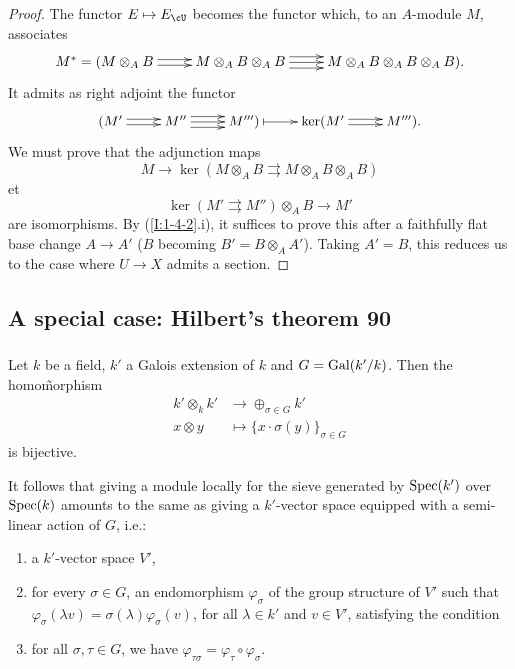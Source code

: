 \begin{proof}
The functor $E\mapsto E_\cU$ becomes the functor which, to an $A$-module $M$,
associates 
\[\xymatrix{
  M^* = (M\otimes_A B \ar@<2pt>[r] \ar@<-2pt>[r] 
    & M\otimes_A B\otimes_A B \ar@<-4pt>[r] \ar[r] \ar@<4pt>[r] 
    & M\otimes_A B\otimes_A B\otimes_A B)\text{.}
}\]
It admits as right adjoint the functor
\[\xymatrix{
  (M' \ar@<2pt>[r] \ar@<-2pt>[r] 
    & M'' \ar@<-4pt>[r] \ar[r] \ar@<4pt>[r]
    & M''') \ar@{|->}[r] 
    & \ker(M' \ar@<2pt>[r] \ar@<-2pt>[r] 
    & M''')\text{.}
}\]
We must prove that the adjunction maps 
\[
  M \to\ker(M\otimes_A B\rightrightarrows M\otimes_A B\otimes_A B)
\]
et
\[
  \ker(M'\rightrightarrows M'')\otimes_A B \to M'
\]
are isomorphisms. By (\ref{I:1-4-2}.i), it suffices to prove this
after a faithfully flat base change $A\to A'$ ($B$ becoming
$B'=B\otimes_A A'$). Taking $A'=B$, this reduces us to the case where $U\to X$
admits a section.
\end{proof}










\subsection{A special case: Hilbert's theorem 90}\label{I:1-5}





\subsubsection{}\label{I:1-5-1}

Let $k$ be a field, $k'$ a Galois extension of $k$ and $G=\operatorname{Gal}(k'/k)$.
Then the homo\~morphism 
\begin{align*}
  k'\otimes_k k' &\to \oplus_{\sigma\in G} k' \\
  x\otimes y     &\mapsto \{x\cdot \sigma(y)\}_{\sigma\in G}
\end{align*}
is bijective. 

It follows that giving a module locally for 
the sieve generated by $\operatorname{Spec}(k')$ over $\operatorname{Spec}(k)$ amounts to the same as giving a 
$k'$-vector space equipped with a semi-linear action of $G$, i.e.: 
\begin{enumerate}[\indent a)]
  \item a $k'$-vector space $V'$,
  \item for every $\sigma\in G$, an endomorphism $\varphi_\sigma$ of the 
    group structure of $V'$ such that 
    $\varphi_\sigma(\lambda v) = \sigma(\lambda) \varphi_\sigma(v)$, for
    all $\lambda\in k'$ and $v\in V'$, satisfying the condition
  \item for all $\sigma,\tau\in G$, we have 
    $\varphi_{\tau\sigma} = \varphi_\tau\circ\varphi_\sigma$. 
\end{enumerate}

